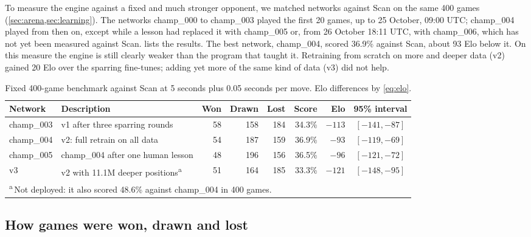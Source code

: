 To measure the engine against a fixed and much stronger opponent, we matched
networks against Scan on the same 400 games (\cref{sec:arena,sec:learning}).
The networks champ\_000 to champ\_003 played the first 20 games, up to
25 October, 09:00 UTC; champ\_004 played from then on, except while a lesson had replaced it with
champ\_005 or, from 26 October 18:11 UTC, with champ\_006, which has not yet been
measured against Scan.  lists the results. The best network,
champ\_004, scored 36.9\% against Scan, about 93 Elo below it. On this measure the engine is
still clearly weaker than the program that taught it. Retraining from scratch on
more and deeper data (v2) gained 20 Elo over the sparring fine-tunes; adding yet
more of the same kind of data (v3) did not help.

\begin{table}[ht]
  \centering
  \caption{Fixed 400-game benchmark against Scan at 5 seconds plus 0.05 seconds
  per move. Elo differences by \cref{eq:elo}.}\label{tab:scan}
  \small\setlength{\tabcolsep}{4pt}
  \begin{tabular}{llrrrrrc}
    \toprule
    Network & Description & Won & Drawn & Lost & Score & Elo & 95\% interval \\
    \midrule
    champ\_003 & v1 after three sparring rounds     & 58 & 158 & 184 & 34.3\% & $-113$ & $[-141,-87]$ \\
    champ\_004 & v2: full retrain on all data       & 54 & 187 & 159 & 36.9\% & $-93$  & $[-119,-69]$ \\
    champ\_005 & champ\_004 after one human lesson  & 48 & 196 & 156 & 36.5\% & $-96$  & $[-121,-72]$ \\
    v3         & v2 with 11.1M deeper positions\textsuperscript{a} & 51 & 164 & 185 & 33.3\% & $-121$ & $[-148,-95]$ \\
    \bottomrule
    \multicolumn{8}{l}{\footnotesize\textsuperscript{a}\,Not deployed: it also scored 48.6\% against champ\_004 in 400 games.}
  \end{tabular}
\end{table}

\subsection{How games were won, drawn and lost}\label{sec:res-how}

